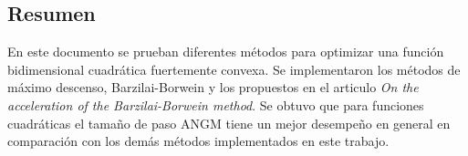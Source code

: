 \begin{center}
    \begin{minipage}{0.8\linewidth}
        \begin{center}
            \subsection*{Resumen}
        \end{center}

        En este documento se prueban diferentes métodos para optimizar una función bidimensional cuadrática fuertemente convexa. Se implementaron los métodos de máximo descenso, Barzilai-Borwein y los propuestos en el articulo \textit{On the acceleration of the Barzilai-Borwein method}. Se obtuvo que para funciones cuadráticas el tamaño de paso ANGM tiene un mejor desempeño en general en comparación con los demás métodos implementados en este trabajo.
    \end{minipage}
\end{center}